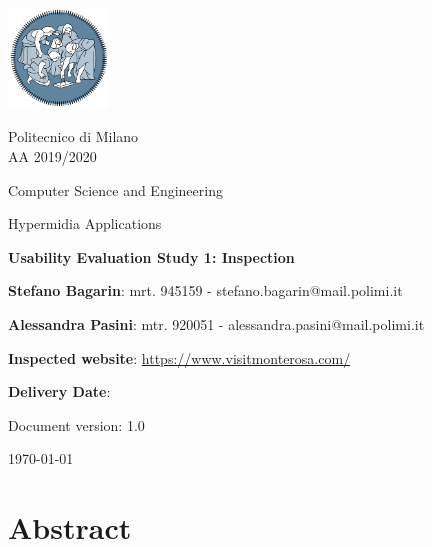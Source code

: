 \documentclass[11pt, a4paperm, hidelinks]{article}
\begin{document}
	\begin{titlepage}
		\centering
		\includegraphics[width=0.20\textwidth]{./assets/polimi-logo.png}\par

		{Politecnico di Milano \\ AA 2019/2020} \par
		\vspace{1.5cm}

		{Computer Science and Engineering}\par
		\Large{Hypermidia Applications}\par
		\vspace{1.0cm}

		{\LARGE \textbf{Usability Evaluation Study 1: Inspection} \par}
		\vspace{1.5cm}

		{\normalsize {\textbf{Stefano Bagarin}: mrt. 945159 -  stefano.bagarin@mail.polimi.it }\par}
		\vspace{0.2cm}
		{\normalsize{\textbf{Alessandra Pasini}: mtr. 920051 - alessandra.pasini@mail.polimi.it}\par}
		\vspace{1.0cm}
		
		{\normalsize {\textbf{Inspected website}: \url{https://www.visitmonterosa.com/}}\par}
		\vspace{0.2cm}
		{\normalsize {\textbf{Delivery Date}: }\par}
		\vfill

		{\large Document version: 1.0\par}
		{\large \today \par}
	\end{titlepage}

	\tableofcontents
	\clearpage


	\section{Abstract}
	
	\clearpage
\end{document}
